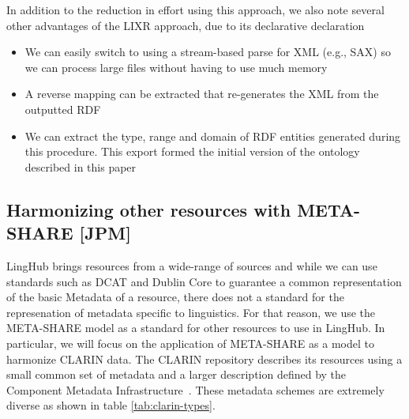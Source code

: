 \documentclass{llncs}
\begin{document}
In addition to the reduction in effort using this approach, we also note several
other advantages of the LIXR approach, due to its declarative declaration

\begin{itemize}
    \item We can easily switch to using a stream-based parse for XML (e.g., SAX)
        so we can process large files without having to use much memory
    \item A reverse mapping can be extracted that re-generates the XML from the
        outputted RDF
    \item We can extract the type, range and domain of RDF entities generated
        during this procedure. This export formed the initial version of the
        ontology described in this paper
\end{itemize}

\subsection{Harmonizing other resources with META-SHARE [JPM]}
\label{sec:harmonization}

LingHub brings resources from a wide-range of sources and while we can use
standards such as DCAT and Dublin Core to guarantee a common representation of the basic
Metadata of a resource, there does not a standard for the represenation of
metadata specific to linguistics. For that reason, we use the META-SHARE model
as a standard for other resources to use in LingHub. In particular, we will
focus on the application of META-SHARE as a model to harmonize CLARIN data. The
CLARIN repository describes its resources using a small common set of metadata
and a larger description defined by the Component Metadata
Infrastructure~\cite[CMDI]{broeder2012cmdi}. These metadata schemes are
extremely diverse as shown in table \ref{tab:clarin-types}.
\end{document}
